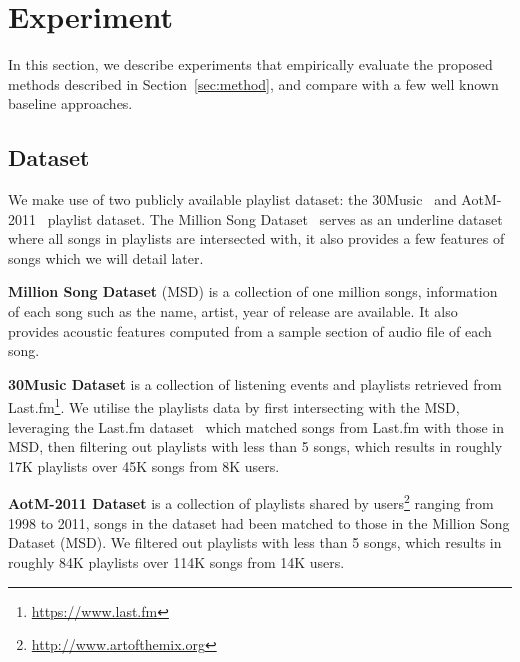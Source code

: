 \section{Experiment}
\label{sec:experiment}

In this section, we describe experiments that empirically evaluate the proposed methods
described in Section~\ref{sec:method}, and compare with a few well known baseline approaches.


\subsection{Dataset}
We make use of two publicly available playlist dataset: the 30Music~\cite{30music2015} and AotM-2011~\cite{mcfee2012hypergraph} playlist dataset.
The Million Song Dataset~\cite{msd2011} serves as an underline dataset where all songs in playlists are intersected with,
it also provides a few features of songs which we will detail later.

{\bf Million Song Dataset} (MSD) is a collection of one million songs, information of each song such as the name, artist, year of release are available.
It also provides acoustic features computed from a sample section of audio file of each song. %

{\bf 30Music Dataset} is a collection of listening events and playlists retrieved from Last.fm\footnote{\url{https://www.last.fm}}.
We utilise the playlists data by first intersecting with the MSD, leveraging the Last.fm dataset~\cite{lastfmdataset}
which matched songs from Last.fm with those in MSD, then filtering out playlists with less than 5 songs,
which results in roughly 17K playlists over 45K songs from 8K users.

{\bf AotM-2011 Dataset} is a collection of playlists shared by users\footnote{\url{http://www.artofthemix.org}} ranging from 1998 to 2011,
songs in the dataset had been matched to those in the Million Song Dataset (MSD).
We filtered out playlists with less than 5 songs, which results in roughly 84K playlists over 114K songs from 14K users.


